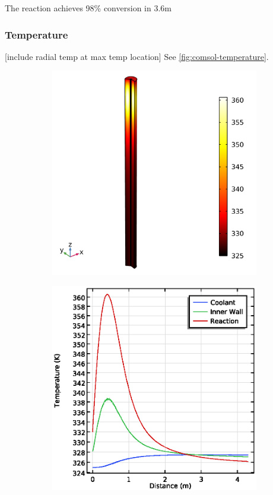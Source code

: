 The reaction achieves 98\% conversion in 3.6m 
\subsubsection{Temperature}
[include radial temp at max temp location]
See \cref{fig:comsol-temperature}.

\begin{figure}[h]
    \centering

    \begin{subfigure}{0.49\linewidth}
        \includegraphics[width=\linewidth, scale=0.5]{figures/temperature-surface.png}
        \caption{}
        \label{fig:comsol-temperature:surface}
    \end{subfigure}
    \begin{subfigure}{0.49\linewidth}
        \includegraphics[width=\linewidth, scale=0.5]{figures/temperature-lines.eps}

\end{subfigure}
\end{figure}
